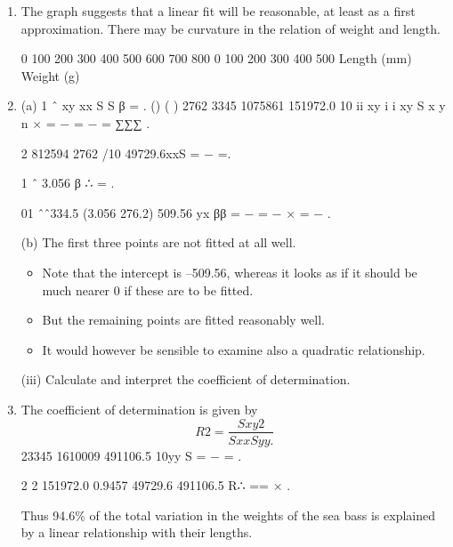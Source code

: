 \documentclass[a4paper,12pt]{article}
\begin{document}
\begin{enumerate} 
\item  The graph suggests that a linear fit will be reasonable, at least as a first approximation.  There may be curvature in the relation of weight and length. 
 
 
0
100
200
300
400
500
600
700
800
0 100 200 300 400 500 Length (mm)
Weight (g)
 
 
\item  (a) 1 ˆ xy xx S S β = . 
() ( ) 2762 3345 1075861 151972.0 10 ii
xy i i
xy
S x y
n
× = − = − = ∑∑∑ . 
 
2 812594 2762 /10 49729.6xxS = − =. 
 
1 ˆ 3.056 β ∴ = . 
 
01 ˆˆ334.5 (3.056 276.2) 509.56 yx ββ = − = − × = − . 
 
 
 (b) The first three points are not fitted at all well. 
 
 \begin{itemize}
     \item Note that the intercept is –509.56, whereas it looks as if it should be much nearer 0 if these are to be fitted.  
     \item But the remaining points are fitted reasonably well. 
     \item It would however be sensible to examine also a quadratic relationship. 
 \end{itemize}
\newpage 
\begin{framed}
(iii) Calculate and interpret the coefficient of determination. 
\end{framed} 
\item  The coefficient of determination is given by 
\[R2 = \frac{Sxy2}{SxxSyy.}\] 
 23345 1610009 491106.5 10yy S = − = . 
 
2 2 151972.0 0.9457 49729.6 491106.5 R∴ == × . 
 
Thus 94.6\% of the total variation in the weights of the sea bass is explained by a linear relationship with their lengths. 
\end{enumerate}
\end{document}
